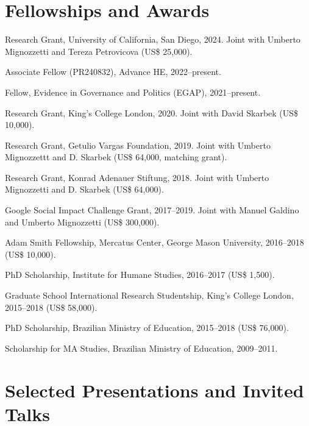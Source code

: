 \documentclass[a4paper]{article}
\renewenvironment{itemize}{
	\begin{list}{}{
			\setlength{\leftmargin}{1.5em}
		}
		}{
	\end{list}
}
\begin{document}
\section*{Fellowships and Awards}

\begin{itemize}
\item Research Grant, University of California, San Diego, 2024. Joint with Umberto Mignozzetti and Tereza Petrovicova (US\$ 25,000).
\item Associate Fellow (PR240832), Advance HE, 2022--present.
\item Fellow, Evidence in Governance and Politics (EGAP), 2021--present.
\item Research Grant, King's College London, 2020. Joint with David Skarbek (US\$ 10,000).
\item Research Grant, Getulio Vargas Foundation, 2019. Joint with Umberto Mignozzettt and D. Skarbek (US\$ 64,000, matching grant).
\item Research Grant, Konrad Adenauer Stiftung, 2018. Joint with Umberto Mignozzetti and D. Skarbek (US\$ 64,000).
\item Google Social Impact Challenge Grant, 2017--2019. Joint with Manuel Galdino and Umberto Mignozzetti (US\$ 300,000).
\item Adam Smith Fellowship, Mercatus Center, George Mason University, 2016--2018 (US\$ 10,000).
\item PhD Scholarship, Institute for Humane Studies, 2016--2017 (US\$ 1,500).
\item Graduate School International Research Studentship, King's College London, 2015--2018 (US\$ 58,000).
\item PhD Scholarship, Brazilian Ministry of Education, 2015--2018 (US\$ 76,000).
\item Scholarship for MA Studies, Brazilian Ministry of Education, 2009--2011.
\end{itemize}

\section*{Selected Presentations and Invited Talks}
\end{document}
